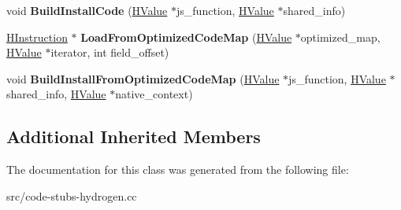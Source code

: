 \begin{DoxyCompactItemize}
\item 
\hypertarget{classv8_1_1internal_1_1_code_stub_graph_builder_base_aaec7ae278ca671a00341b0de7a83525a}{}void {\bfseries Build\+Install\+Code} (\hyperlink{classv8_1_1internal_1_1_h_value}{H\+Value} $\ast$js\+\_\+function, \hyperlink{classv8_1_1internal_1_1_h_value}{H\+Value} $\ast$shared\+\_\+info)\label{classv8_1_1internal_1_1_code_stub_graph_builder_base_aaec7ae278ca671a00341b0de7a83525a}

\item 
\hypertarget{classv8_1_1internal_1_1_code_stub_graph_builder_base_ab6e5a94129e1a7ef9408eb4af53e8e54}{}\hyperlink{classv8_1_1internal_1_1_h_instruction}{H\+Instruction} $\ast$ {\bfseries Load\+From\+Optimized\+Code\+Map} (\hyperlink{classv8_1_1internal_1_1_h_value}{H\+Value} $\ast$optimized\+\_\+map, \hyperlink{classv8_1_1internal_1_1_h_value}{H\+Value} $\ast$iterator, int field\+\_\+offset)\label{classv8_1_1internal_1_1_code_stub_graph_builder_base_ab6e5a94129e1a7ef9408eb4af53e8e54}

\item 
\hypertarget{classv8_1_1internal_1_1_code_stub_graph_builder_base_a8a93ab235de57f489c5c222e4373ba89}{}void {\bfseries Build\+Install\+From\+Optimized\+Code\+Map} (\hyperlink{classv8_1_1internal_1_1_h_value}{H\+Value} $\ast$js\+\_\+function, \hyperlink{classv8_1_1internal_1_1_h_value}{H\+Value} $\ast$shared\+\_\+info, \hyperlink{classv8_1_1internal_1_1_h_value}{H\+Value} $\ast$native\+\_\+context)\label{classv8_1_1internal_1_1_code_stub_graph_builder_base_a8a93ab235de57f489c5c222e4373ba89}

\end{DoxyCompactItemize}
\subsection*{Additional Inherited Members}


The documentation for this class was generated from the following file\+:\begin{DoxyCompactItemize}
\item 
src/code-\/stubs-\/hydrogen.\+cc\end{DoxyCompactItemize}
